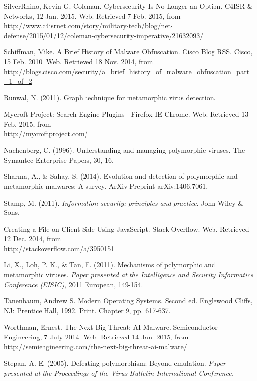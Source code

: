\begin{thebibliography}{10}
 SilverRhino, Kevin G. Coleman. Cybersecurity Is No Longer an Option. C4ISR \& Networks, 12 Jan. 2015. Web. Retrieved 7 Feb. 2015, from \\
\url{http://www.c4isrnet.com/story/military-tech/blog/net-defense/2015/01/12/coleman-cybersecurity-imperative/21632093/}

 Schiffman, Mike. A Brief History of Malware Obfuscation. Cisco Blog RSS. Cisco, 15 Feb. 2010. Web. Retrieved 18 Nov. 2014, from \\
\url{http://blogs.cisco.com/security/a_brief_history_of_malware_obfuscation_part_1_of_2 }

 Runwal, N. (2011). Graph technique for metamorphic virus detection.

 Mycroft Project: Search Engine Plugins - Firefox IE Chrome. Web. Retrieved 13 Feb. 2015, from \\
\url{http://mycroftproject.com/}

 Nachenberg, C. (1996). Understanding and managing polymorphic viruses. The Symantec Enterprise Papers, 30, 16.

 Sharma, A., \& Sahay, S. (2014). Evolution and detection of polymorphic and metamorphic malwares: A survey. ArXiv Preprint arXiv:1406.7061,

 Stamp, M. (2011). {\it Information security: principles and practice}. John Wiley \& Sons.

 Creating a File on Client Side Using JavaScript. Stack Overflow. Web. Retrieved 12 Dec. 2014, from \\
\url{http://stackoverflow.com/a/3950151}

 Li, X., Loh, P. K., \& Tan, F. (2011). Mechanisms of polymorphic and metamorphic viruses. {\it Paper presented at the Intelligence and Security Informatics Conference (EISIC)}, 2011 European, 149-154.

 Tanenbaum, Andrew S. Modern Operating Systems. Second ed. Englewood Cliffs, NJ: Prentice Hall, 1992. Print. Chapter 9, pp. 617-637.

 Worthman, Ernest. The Next Big Threat: AI Malware. Semiconductor Engineering, 7 July 2014. Web. Retrieved 14 Jan. 2015, from \\
\url{http://semiengineering.com/the-next-big-threat-ai-malware/}

 Stepan, A. E. (2005). Defeating polymorphism: Beyond emulation. {\it Paper presented at the Proceedings of the Virus Bulletin International Conference.}


\end{thebibliography}
